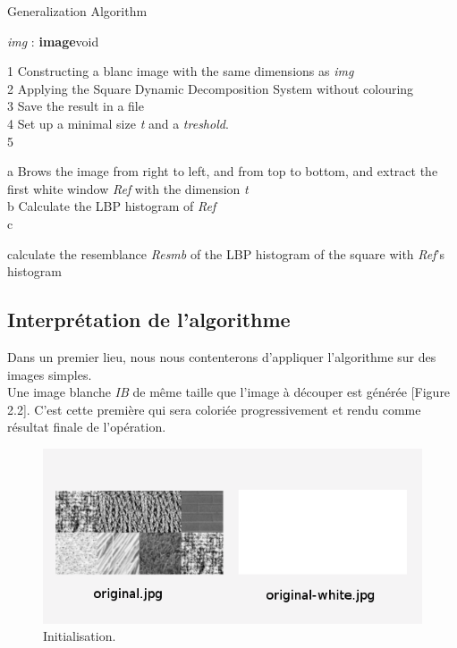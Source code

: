 \label{Algorithme de généralisation}
\begin{algorithme}[H]
\caption{Generalization Algorithm}
{\textit{img} : \textbf{image}}{void}
{
1 Constructing a blanc image with the same dimensions as \textit{img}\\
2 Applying the Square Dynamic Decomposition System without colouring \\
3 Save the result in a file\\
4 Set up a minimal size \textit{t} and a \textit{treshold}.\\
5 
{
	a Brows the image from right to left, and from top to bottom, and extract the first white window
	\textit{Ref} with the dimension \textit{t} \\
	b Calculate the LBP histogram of \textit{Ref}\\
		
	c 
		{
			calculate the resemblance \textit{Resmb} of the LBP histogram of the square with \textit{Ref}'s histogram

		}

}
}
\end{algorithme}


\subsection{Interprétation de l'algorithme}

\indent Dans un premier lieu, nous nous contenterons d'appliquer l'algorithme sur des images simples.\\
Une image blanche \textit{IB} de même taille que l'image à découper est générée [Figure 2.2]. C'est cette première qui sera coloriée progressivement et rendu comme résultat finale de l'opération.

\begin{figure}[H]
	\centering
		\includegraphics[width=14cm,]{Figures/chap2/2.png}
		
	\caption[initialisation]{Initialisation.}
	\label{fig:division}
\end{figure}

